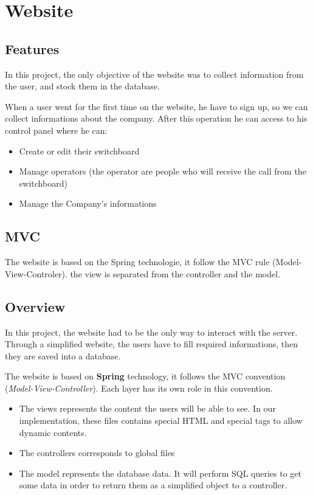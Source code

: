 \chapter{Website}
\section{Features}
In this project, the only objective of the website was to collect information from the user, and stock them in the database.

When a user went for the first time on the website, he have to sign up, so we can collect informations about the company. After this operation he can access to his control panel where he can:
\begin{itemize}  
\item Create or edit their switchboard
\item Manage operators (the operator are people who will receive the call from the switchboard)
\item Manage the Company's informations
\end{itemize}  



\section{MVC}
The website is based on the Spring technologie,  it follow the MVC rule (Model-View-Controler). the view is separated from the controller and the model.


\section{Overview}
In this project, the website had to be the only way to interact with the server. Through a simplified website, the users have to fill required informations, then they are saved into a database.
\newline

The website is based on \textbf{Spring} technology,  it follows the MVC convention (\textit{Model-View-Controller}). Each layer has its own role in this convention.


\begin{itemize}  
\item The views represents the content the users will be able to see. In our implementation, these files contains special HTML and special tags to allow dynamic contents. 
\item The controllers corresponds to global files 
\item The model represents the database data. It will perform SQL queries to get some data in order to return them as a simplified object to a controller.
\end{itemize}  

